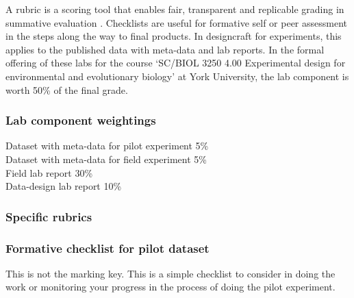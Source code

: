 \documentclass[
]{book}
\begin{document}
A rubric is a scoring tool that enables fair, transparent and replicable grading in summative evaluation \citep{RN6799}. Checklists are useful for formative self or peer assessment in the steps along the way to final products. In designcraft for experiments, this applies to the published data with meta-data and lab reports. In the formal offering of these labs for the course `SC/BIOL 3250 4.00 Experimental design for environmental and evolutionary biology' at York University, the lab component is worth 50\% of the final grade.

\hypertarget{lab-component-weightings}{%
\subsubsection*{Lab component weightings}\label{lab-component-weightings}}

Dataset with meta-data for pilot experiment 5\%\\
Dataset with meta-data for field experiment 5\%\\
Field lab report 30\%\\
Data-design lab report 10\%

\hypertarget{specific-rubrics}{%
\subsubsection*{Specific rubrics}\label{specific-rubrics}}

\hypertarget{formative-checklist-for-pilot-dataset}{%
\subsubsection*{Formative checklist for pilot dataset}\label{formative-checklist-for-pilot-dataset}}

This is not the marking key. This is a simple checklist to consider in doing the work or monitoring your progress in the process of doing the pilot experiment.
\end{document}
